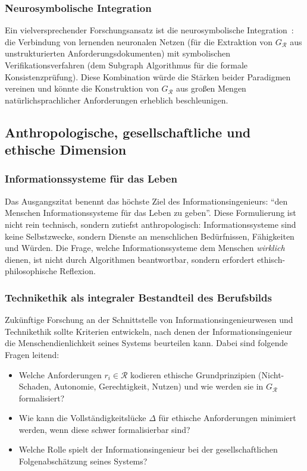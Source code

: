 ﻿\documentclass[a4paper,12pt]{article}
\theoremstyle{definition}
\begin{document}
\subsubsection{Neurosymbolische Integration}

Ein vielversprechender Forschungsansatz ist die neurosymbolische Integration~\cite{lamb2020}:
die Verbindung von lernenden neuronalen Netzen (für die Extraktion von $G_\mathcal{R}$
aus unstrukturierten Anforderungsdokumenten) mit symbolischen Verifikationsverfahren
(dem Subgraph Algorithmus für die formale Konsistenzprüfung). Diese Kombination
würde die Stärken beider Paradigmen vereinen und könnte die Konstruktion von
$G_\mathcal{R}$ aus großen Mengen natürlichsprachlicher Anforderungen erheblich
beschleunigen.

\subsection{Anthropologische, gesellschaftliche und ethische Dimension}

\subsubsection{Informationssysteme für das Leben}

Das Ausgangszitat benennt das höchste Ziel des Informationsingenieurs:
\enquote{den Menschen Informationssysteme für das Leben zu geben}. Diese Formulierung
ist nicht rein technisch, sondern zutiefst anthropologisch: Informationssysteme
sind keine Selbstzwecke, sondern Dienste an menschlichen Bedürfnissen, Fähigkeiten
und Würden. Die Frage, welche Informationssysteme dem Menschen \emph{wirklich} dienen,
ist nicht durch Algorithmen beantwortbar, sondern erfordert ethisch-philosophische
Reflexion.

\subsubsection{Technikethik als integraler Bestandteil des Berufsbilds}

Zukünftige Forschung an der Schnittstelle von Informationsingenieurwesen und Technikethik
sollte Kriterien entwickeln, nach denen der Informationsingenieur die Menschendienlichkeit
seines Systems beurteilen kann. Dabei sind folgende Fragen leitend:
\begin{itemize}
  \item Welche Anforderungen $r_i \in \mathcal{R}$ kodieren ethische Grundprinzipien
        (Nicht-Schaden, Autonomie, Gerechtigkeit, Nutzen) und wie werden sie in
        $G_\mathcal{R}$ formalisiert?
  \item Wie kann die Vollständigkeitslücke $\Delta$ für ethische Anforderungen
        minimiert werden, wenn diese schwer formalisierbar sind?
  \item Welche Rolle spielt der Informationsingenieur bei der gesellschaftlichen
        Folgenabschätzung seines Systems?
\end{itemize}
\end{document}
